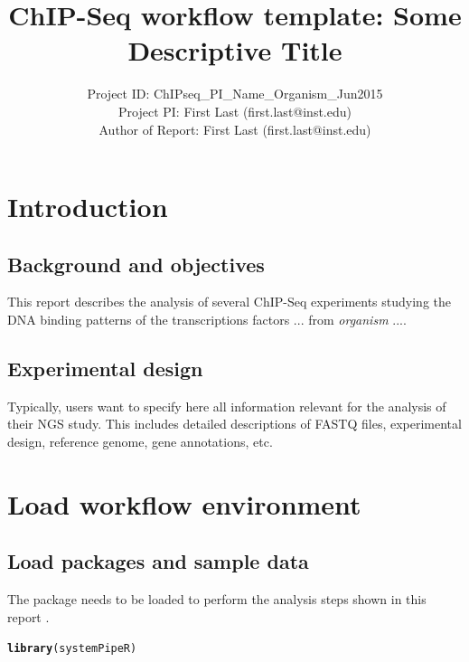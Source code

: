 \documentclass{article}\usepackage[]{graphicx}\usepackage[]{color}
\makeatletter
\newcommand{\hlstd}[1]{\textcolor[rgb]{0.345,0.345,0.345}{#1}}%
\newcommand{\hlkwd}[1]{\textcolor[rgb]{0.737,0.353,0.396}{\textbf{#1}}}%
\newenvironment{kframe}{%
 \def\at@end@of@kframe{}%
 \ifinner\ifhmode%
  \def\at@end@of@kframe{\end{minipage}}%
  \begin{minipage}{\columnwidth}%
 \fi\fi%
 \def\FrameCommand##1{\hskip\@totalleftmargin \hskip-\fboxsep
 \colorbox{shadecolor}{##1}\hskip-\fboxsep
     \hskip-\linewidth \hskip-\@totalleftmargin \hskip\columnwidth}%
 \MakeFramed {\advance\hsize-\width
   \@totalleftmargin\z@ \linewidth\hsize
   \@setminipage}}%
 {\par\unskip\endMakeFramed%
 \at@end@of@kframe}
\newenvironment{knitrout}{}{} %
\makeatother
\begin{document}
\title{ChIP-Seq workflow template: Some Descriptive Title}
\author{Project ID: ChIPseq\_PI\_Name\_Organism\_Jun2015 \\
	Project PI: First Last (first.last@inst.edu)\\
        Author of Report: First Last (first.last@inst.edu)}
\maketitle

\tableofcontents

\section{Introduction}
\subsection{Background and objectives}
This report describes the analysis of several ChIP-Seq experiments studying the DNA binding patterns of the transcriptions factors ... from \textit{organism} .... 

\subsection{Experimental design}
Typically, users want to specify here all information relevant for the analysis of their NGS study. This includes detailed descriptions of FASTQ files, experimental design, reference genome, gene annotations, etc.  

\section{Load workflow environment}

\subsection{Load packages and sample data}
The  package needs to be loaded to perform the analysis steps shown in this report \citep{Girke2014-oy}. 
\begin{knitrout}
\color{fgcolor}\begin{kframe}
\begin{alltt}
\hlkwd{library}\hlstd{(systemPipeR)}
\end{alltt}
\end{kframe}
\end{knitrout}
\end{document}
